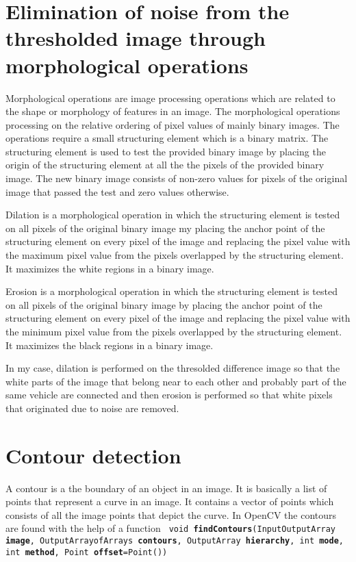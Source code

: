 \documentclass[a4paper]{aitthesis}
\begin{document}
\section{Elimination of noise from the thresholded image through morphological operations}
 Morphological operations are image processing operations which are related to the shape or morphology of features in an image. The morphological operations processing on the relative ordering of pixel values of mainly binary images. The operations require a small structuring element which is a binary matrix. The structuring element is used to test the provided binary image by placing the origin of the structuring element at all the the pixels of the provided binary image. The new binary image consists of non-zero values for pixels of the original image that passed the test and zero values otherwise.
 
 Dilation is a morphological operation in which the structuring element is tested on all pixels of the original binary image my placing the anchor point of the structuring element on every pixel of the image and replacing the pixel value with the maximum pixel value from the pixels overlapped by the structuring element. It maximizes the white regions in a binary image. 
 
 Erosion is a morphological operation in which the structuring element is tested on all pixels of the original binary image by placing the anchor point of the structuring element on every pixel of the image and replacing the pixel value with the minimum pixel value from the pixels overlapped by the structuring element. It maximizes the black regions in a binary image.
 
In my case, dilation is performed on the thresolded difference image so that the white parts of the image that belong near to each other and probably part of the same vehicle are connected and then erosion is performed so that white pixels that originated due to noise are removed.

\section{Contour detection}
A contour is a the boundary of an object in an image. It is basically a list of points that represent a curve in an image. It contains a vector of points which consists of all the image points that depict the curve. In OpenCV the contours are found with the help of a function \newline \texttt{ void \textbf{findContours}(InputOutputArray \textbf{image}, \newline OutputArrayofArrays \textbf{contours}, OutputArray \textbf{hierarchy}, int \textbf{mode}, \newline int \textbf{method}, Point \textbf{offset}=Point())} 
\end{document}
